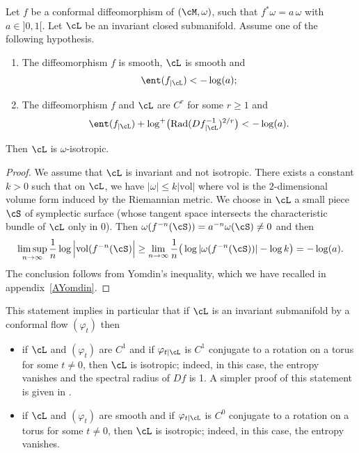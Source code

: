 \begin{proposition}\label{PYomdin}
Let $f$ be a conformal diffeomorphism of $(\cM, \omega)$, \ie such that $f^*\omega=a\,\omega$ with $a\in{}]0, 1[$. Let ${\cL}$ be an invariant closed submanifold. Assume one of the following hypothesis.
\begin{enumerate}
\item The diffeomorphism $f$ is smooth, $\cL$ is smooth and\vspace*{-3pt}
\[
\ent(f_{|{\cL}}) < - \log(a);
\]
\item The diffeomorphism $f$ and $\cL$ are $C^r$ for some $r\geq 1$ and\vspace*{-3pt}
\[
\ent(f_{|{\cL}}) + \log^+\bigl(\text{\rm Rad} (Df^{-1}_{|{\cL}})^{2/r}\bigr) < -\log(a).
\]
\end{enumerate}
Then ${\cL}$ is $\omega$-isotropic.
\end{proposition}

\begin{proof}
We assume that $\cL$ is invariant and not isotropic. There exists a constant $k>0$ such that on $\cL$, we have $\vert\omega\vert\leq k\vert \mathrm{vol}\vert$ where $\mathrm{vol}$ is the $2$\nobreakdash-dimensional volume form induced by the Riemannian metric. We choose in $\cL$ a small piece $\cS$ of symplectic surface (whose tangent space intersects the characteristic bundle of $\cL$ only in $0$). Then $\omega(f^{-n}(\cS))=a^{-n}\omega(\cS)\not=0$ and then
\[
\limsup_{n\to \infty} \frac{1}{n}\log\Big\vert \mathrm{vol}(f^{-n}
(\cS)\Big\vert\geq \lim_{n\to\infty}\frac{1}{n}\big(\log\vert \omega(f^{-n}(\cS))\vert-\log k\big)=-\log(a).
\]
The conclusion follows from Yomdin's inequality, which we have recalled in appendix~\ref{AYomdin}.
\end{proof}

\begin{remark}
This statement implies in particular that if $\cL$ is an invariant submanifold by a conformal flow $(\varphi_t)$ then
\begin{itemize}
\item if $\cL$ and $(\varphi_t)$ are $C^1$ and if $\varphi_{t|\cL}$ is $C^1$ conjugate to a rotation on a torus for some $t\not=0$, then $\cL$ is isotropic; indeed, in this case, the entropy vanishes and the spectral radius of $Df$ is 1. A simpler proof of this statement is given in \cite{CaCeLlA2013}.
\item if $\cL$ and $(\varphi_t)$ are smooth and if $\varphi_{t|\cL}$ is $C^0$ conjugate to a rotation on a torus for some $t\not=0$, then $\cL$ is isotropic; indeed, in this case, the entropy vanishes.
\end{itemize}
\end{remark}

